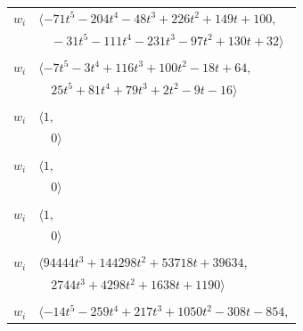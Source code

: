 \documentclass[11pt]{article}
\begin{document}
\begin{longtable}{@{}ll@{}}
$w_i$ & $\langle -71t^{5}-204t^{4}-48t^{3}+226t^{2}+149t+100,$\\
 & $\quad -31t^{5}-111t^{4}-231t^{3}-97t^{2}+130t+32\rangle$\\
\addlinespace[2pt]
\multicolumn{2}{@{}p{0.97\textwidth}@{}}{$i=51$, $D_i=1$, $\rho_{ij}$: $4{:}1, \allowbreak 16{:}2, \allowbreak 22{:}1, \allowbreak 32{:}1, \allowbreak 50{:}1, \allowbreak 56{:}2, \allowbreak 62{:}2, \allowbreak 88{:}1, \allowbreak 95{:}1, \allowbreak 97{:}2$}\\
$w_i$ & $\langle -7t^{5}-3t^{4}+116t^{3}+100t^{2}-18t+64,$\\
 & $\quad 25t^{5}+81t^{4}+79t^{3}+2t^{2}-9t-16\rangle$\\
\addlinespace[2pt]
\multicolumn{2}{@{}p{0.97\textwidth}@{}}{$i=52$, $D_i=1$, $\rho_{ij}$: $--$}\\
$w_i$ & $\langle 1,$\\
 & $\quad 0\rangle$\\
\addlinespace[2pt]
\multicolumn{2}{@{}p{0.97\textwidth}@{}}{$i=53$, $D_i=1$, $\rho_{ij}$: $--$}\\
$w_i$ & $\langle 1,$\\
 & $\quad 0\rangle$\\
\addlinespace[2pt]
\multicolumn{2}{@{}p{0.97\textwidth}@{}}{$i=54$, $D_i=1$, $\rho_{ij}$: $--$}\\
$w_i$ & $\langle 1,$\\
 & $\quad 0\rangle$\\
\addlinespace[2pt]
\multicolumn{2}{@{}p{0.97\textwidth}@{}}{$i=55$, $D_i=1$, $\rho_{ij}$: $6{:}2, \allowbreak 9{:}1, \allowbreak 11{:}2, \allowbreak 13{:}1, \allowbreak 22{:}1, \allowbreak 57{:}2, \allowbreak 63{:}1, \allowbreak 65{:}1, \allowbreak 68{:}2, \allowbreak 71{:}2, \allowbreak 76{:}2, \allowbreak 93{:}1$}\\
$w_i$ & $\langle 94444t^{3}+144298t^{2}+53718t+39634,$\\
 & $\quad 2744t^{3}+4298t^{2}+1638t+1190\rangle$\\
\addlinespace[2pt]
\multicolumn{2}{@{}p{0.97\textwidth}@{}}{$i=56$, $D_i=1$, $\rho_{ij}$: $12{:}2, \allowbreak 18{:}1, \allowbreak 19{:}2, \allowbreak 23{:}1, \allowbreak 24{:}1, \allowbreak 29{:}1, \allowbreak 32{:}1, \allowbreak 33{:}1, \allowbreak 34{:}2, \allowbreak 50{:}2, \allowbreak 51{:}1, \allowbreak 62{:}2, \allowbreak 70{:}1, \allowbreak 77{:}2, \allowbreak 78{:}2, \allowbreak 81{:}2, \allowbreak 82{:}2, \allowbreak 96{:}1$}\\
$w_i$ & $\langle -14t^{5}-259t^{4}+217t^{3}+1050t^{2}-308t-854,$\\

\end{longtable}
\end{document}
